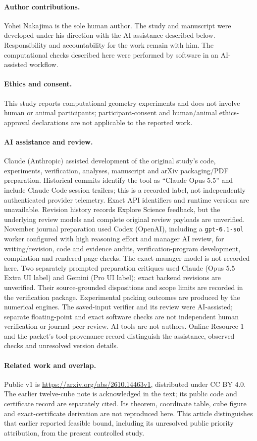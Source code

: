 \documentclass[11pt]{article}
\begin{document}
\paragraph{Author contributions.} Yohei Nakajima is the sole human author. The study and manuscript were developed under his direction with the AI assistance described below. Responsibility and accountability for the work remain with him. The computational checks described here were performed by software in an AI-assisted workflow.
\paragraph{Ethics and consent.} This study reports computational geometry experiments and does not involve human or animal participants; participant-consent and human/animal ethics-approval declarations are not applicable to the reported work.
\paragraph{AI assistance and review.} Claude (Anthropic) assisted development of the original study's code, experiments, verification, analyses, manuscript and arXiv packaging/PDF preparation. Historical commits identify the tool as ``Claude Opus 5.5'' and include Claude Code session trailers; this is a recorded label, not independently authenticated provider telemetry. Exact API identifiers and runtime versions are unavailable. Revision history records Explore Science feedback, but the underlying review models and complete original review payloads are unverified. November journal preparation used Codex (OpenAI), including a \texttt{gpt-6.1-sol} worker configured with high reasoning effort and manager AI review, for writing/revision, code and evidence audits, verification-program development, compilation and rendered-page checks. The exact manager model is not recorded here. Two separately prompted preparation critiques used Claude (Opus 5.5 Extra UI label) and Gemini (Pro UI label); exact backend revisions are unverified. Their source-grounded dispositions and scope limits are recorded in the verification package. Experimental packing outcomes are produced by the numerical engines. The saved-input verifier and its review were AI-assisted; separate floating-point and exact software checks are not independent human verification or journal peer review. AI tools are not authors. Online Resource 1 and the packet's tool-provenance record distinguish the assistance, observed checks and unresolved version details.
\paragraph{Related work and overlap.} Public v1 is \url{https://arxiv.org/abs/2610.14463v1}, distributed under CC BY 4.0. The earlier twelve-cube note is acknowledged in the text; its public code and certificate record are separately cited. Its theorem, coordinate table, cube figure and exact-certificate derivation are not reproduced here. This article distinguishes that earlier reported feasible bound, including its unresolved public priority attribution, from the present controlled study.

\FloatBarrier

\setlength{\bibsep}{1pt plus 0.3ex}
\renewcommand{\bibfont}{\footnotesize}



\end{document}
